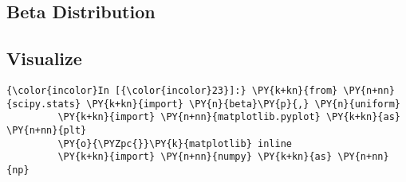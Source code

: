    \subsection{Beta Distribution}\label{beta-distribution}

    \subsection{Visualize}\label{visualize}

    \begin{Verbatim}[commandchars=\\\{\}]
{\color{incolor}In [{\color{incolor}23}]:} \PY{k+kn}{from} \PY{n+nn}{scipy.stats} \PY{k+kn}{import} \PY{n}{beta}\PY{p}{,} \PY{n}{uniform}
         \PY{k+kn}{import} \PY{n+nn}{matplotlib.pyplot} \PY{k+kn}{as} \PY{n+nn}{plt}
         \PY{o}{\PYZpc{}}\PY{k}{matplotlib} inline
         \PY{k+kn}{import} \PY{n+nn}{numpy} \PY{k+kn}{as} \PY{n+nn}{np}
\end{Verbatim}

